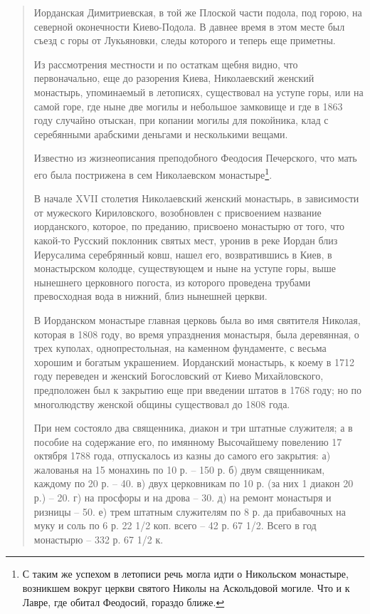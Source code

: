 \begin{quotation}
Иорданская Димитриевская, в той же Плоской части подола, под горою, на северной оконечности Киево-Подола. В давнее время в этом месте был съезд с горы от Лукьяновки, следы которого и теперь еще приметны. 

Из рассмотрения местности и по остаткам щебня видно, что первоначально, еще до разорения Киева, Николаевский женский монастырь, упоминаемый в летописях, существовал на уступе горы, или на самой горе, где ныне две могилы и небольшое замковище и где в 1863 году случайно отыскан, при копании могилы для покойника, клад с серебянными арабскими деньгами и несколькими вещами.

Известно из жизнеописания преподобного Феодосия Печерского, что мать его была пострижена в сем Николаевском монастыре\footnote{С таким же успехом в летописи речь могла идти о Никольском монастыре, возникшем вокруг церкви святого Николы на Аскольдовой могиле. Что и к Лавре, где обитал Феодосий, гораздо ближе.}.

В начале XVII столетия Николаевский женский монастырь, в зависимости от мужеского Кириловского, возобновлен с присвоением название иорданского, которое, по преданию, присвоено монастырю от того, что какой-то Русский поклонник святых мест, уронив в реке Иордан близ Иерусалима серебрянный ковш, нашел его, возвратившись в Киев, в монастырском колодце, существующем и ныне на уступе горы, выше нынешнего церковного погоста, из которого проведена трубами превосходная вода в нижний, близ нынешней церкви.

В Иорданском монастыре главная церковь была во имя святителя Николая, которая в 1808 году, во время упразднения монастыря, была деревянная, о трех куполах, однопрестольная, на каменном фундаменте, с весьма хорошим и богатым украшением. Иорданский монастырь, к коему в 1712 году переведен и женский Богословский от Киево Михайловского, предположен был к закрытию еще при введении штатов в 1768 году; но по многолюдству женской общины существовал до 1808 года. 

При нем состояло два священника, диакон и три штатные служителя; а в пособие на содержание его, по имянному Высочайшему повелению 17 октября 1788 года, отпускалось из казны до самого его закрытия:
а) жалованья на 15 монахинь по 10 р. – 150 р.
б) двум священникам, каждому по 20 р. – 40.
в) двух церковникам по 10 р. (за них 1 диакон 20 р.)  – 20.
г) на просфоры и на дрова – 30.
д) на ремонт монастыря и ризницы – 50.
е) трем штатным служителям по 8 р. да прибавочных на муку и соль по 6 р. 22 1/2 коп. всего  – 42 р. 67 1/2. Всего в год монастырю – 332 р. 67 1/2 к.


\end{quotation}
